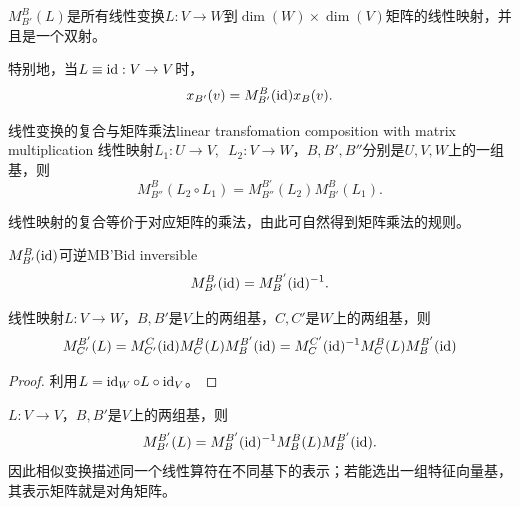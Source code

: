 \begin{corollary}
	$M_{B'}^B(L)$是所有线性变换$L:V \to W$到$\dim(W) \times \dim(V)$矩阵的线性映射，并且是一个双射。
\end{corollary}

\begin{corollary}
	特别地，当$L \equiv \operatorname{id}:V \to V$时，
	\begin{equation}\label{eq:la-change-of-coordinate-matrix}
		x_{B'}(v) = M_{B'}^B(\operatorname{id})x_B(v).
	\end{equation}
\end{corollary}

\begin{theorem}{线性变换的复合与矩阵乘法}{linear transfomation composition with matrix multiplication}
	线性映射$L_1:U \to V,\enspace L_2:V \to W$，$B,B',B''$分别是$U,V,W$上的一组基，则
	\begin{equation}\label{eq:la-composition-matrix}
		M_{B''}^B(L_2 \circ L_1) = M_{B''}^{B'}(L_2)M_{B'}^B(L_1).
	\end{equation}
\end{theorem}
\noindent 线性映射的复合等价于对应矩阵的乘法，由此可自然得到矩阵乘法的规则。
\begin{theorem}{$M_{B'}^B(\operatorname{id})$可逆}{MB'Bid inversible}
	\begin{equation}\label{eq:la-inverse-transition-matrix}
		M_{B'}^B(\operatorname{id}) = M_B^{B'}(\operatorname{id})^{-1}.
	\end{equation}
\end{theorem}
\begin{theorem}{}{}
	线性映射$L:V \to W$，$B,B'$是$V$上的两组基，$C,C'$是$W$上的两组基，则
	\begin{equation}\label{eq:la-transformation-of-matrix}
		M_{C'}^{B'}(L) = M_{C'}^C(\operatorname{id})M_C^B(L)M_B^{B'}(\operatorname{id}) = M_C^{C'}(\operatorname{id})^{-1} M_C^B(L)M_B^{B'}(\operatorname{id})
	\end{equation}
\end{theorem}
\begin{proof}
	利用$L = \operatorname{id}_W \circ L \circ \operatorname{id}_V$。
\end{proof}
\begin{corollary}
	$L:V \to V$，$B,B'$是$V$上的两组基，则
	\begin{equation}\label{eq:la-similarity-under-basis-change}
		M_{B'}^{B'}(L) = M_B^{B'}(\operatorname{id})^{-1} M_B^B(L)M_B^{B'}(\operatorname{id}).
	\end{equation}
	因此相似变换描述同一个线性算符在不同基下的表示；若能选出一组特征向量基，其表示矩阵就是对角矩阵。
\end{corollary}

